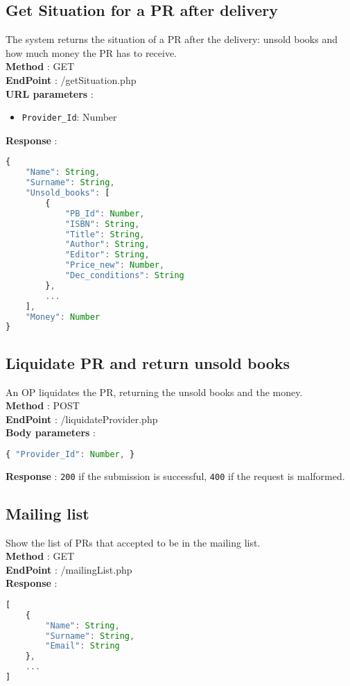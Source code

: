 \subsection{Get Situation for a PR after delivery}
The system returns the situation of a PR after the delivery: unsold books and how much money the PR has to receive.\\
\textbf{Method} : GET \\
\textbf{EndPoint} : /getSituation.php \\
\textbf{URL parameters} :
\begin{itemize}
    \item \texttt{Provider\_Id}: Number
\end{itemize}
\textbf{Response} :
\begin{lstlisting}[language=JavaScript, label={lst:jscode}, basicstyle=\ttfamily]
{
    "Name": String,
    "Surname": String,
    "Unsold_books": [
        {
            "PB_Id": Number,
            "ISBN": String,
            "Title": String,
            "Author": String,
            "Editor": String,
            "Price_new": Number,
            "Dec_conditions": String
        },
        ...
    ],
    "Money": Number
}
\end{lstlisting}

\subsection{Liquidate PR and return unsold books}
An OP liquidates the PR, returning the unsold books and the money.\\
\textbf{Method} : POST \\
\textbf{EndPoint} : /liquidateProvider.php \\
\textbf{Body parameters} :
\begin{lstlisting}[language=JavaScript, label={lst:jscode}, basicstyle=\ttfamily]
{ "Provider_Id": Number, }
\end{lstlisting}
\textbf{Response} : \texttt{200} if the submission is successful, \texttt{400} if the request is malformed.

\subsection{Mailing list}
Show the list of PRs that accepted to be in the mailing list.\\
\textbf{Method} : GET \\
\textbf{EndPoint} : /mailingList.php \\
\textbf{Response} :
\begin{lstlisting}[language=JavaScript, label={lst:jscode}, basicstyle=\ttfamily]
[
    {
        "Name": String,
        "Surname": String,
        "Email": String
    },
    ...
]
\end{lstlisting}

